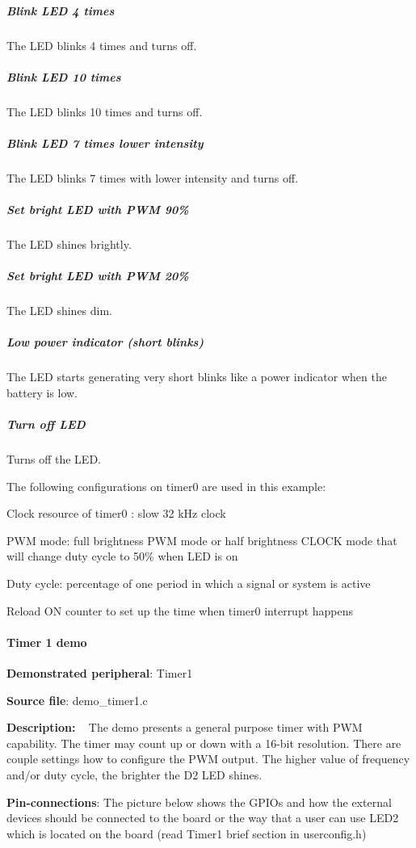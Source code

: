 \subparagraph*{Blink L\+E\+D 4 times}

The L\+E\+D blinks 4 times and turns off.

\subparagraph*{Blink L\+E\+D 10 times}

The L\+E\+D blinks 10 times and turns off.

\subparagraph*{Blink L\+E\+D 7 times lower intensity}

The L\+E\+D blinks 7 times with lower intensity and turns off.

\subparagraph*{Set bright L\+E\+D with P\+W\+M 90\%}

The L\+E\+D shines brightly.

\subparagraph*{Set bright L\+E\+D with P\+W\+M 20\%}

The L\+E\+D shines dim.

\subparagraph*{Low power indicator (short blinks)}

The L\+E\+D starts generating very short blinks like a power indicator when the battery is low.

\subparagraph*{Turn off L\+E\+D}

Turns off the L\+E\+D.

The following configurations on timer0 are used in this example\+:
\begin{DoxyItemize}
\item Clock resource of timer0 \+: slow 32 k\+Hz clock
\item P\+W\+M mode\+: full brightness P\+W\+M mode or half brightness C\+L\+O\+C\+K mode that will change duty cycle to 50\% when L\+E\+D is on
\item Duty cycle\+: percentage of one period in which a signal or system is active
\item Reload O\+N counter to set up the time when timer0 interrupt happens
\end{DoxyItemize}

\paragraph*{Timer 1 demo}


\begin{DoxyItemize}
\item {\bfseries Demonstrated peripheral}\+: Timer1
\item {\bfseries Source file}\+: demo\+\_\+timer1.\+c
\item {\bfseries Description\+:} ~\newline
 The demo presents a general purpose timer with P\+W\+M capability. The timer may count up or down with a 16-\/bit resolution. There are couple settings how to configure the P\+W\+M output. The higher value of frequency and/or duty cycle, the brighter the D2 L\+E\+D shines.
\item {\bfseries Pin-\/connections}\+: The picture below shows the G\+P\+I\+Os and how the external devices should be connected to the board or the way that a user can use L\+E\+D2 which is located on the board (read Timer1 brief section in userconfig.\+h)
\end{DoxyItemize}


